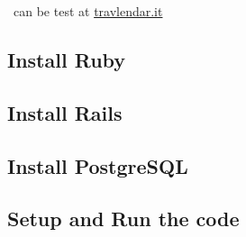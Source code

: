 \projectname~can be test at \href{http://travlendar.it}{travlendar.it}


\subsection*{Install Ruby}
\label{sect:installation:ruby}


\subsection*{Install Rails}
\label{sect:installation:rails}


\subsection*{Install PostgreSQL}
\label{sect:installation:postgresql}


\subsection*{Setup and Run the code}
\label{sect:installation:code}
